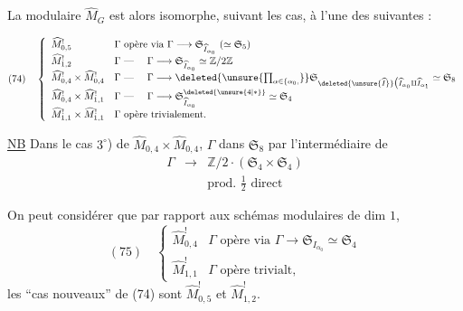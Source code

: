La   modulaire $\widehat M_G$ est alors isomorphe, suivant les cas, à l'une des suivantes :

\[
(74)\quad\left\{\begin{array}{ll}
\widehat M^!_{0,5}&\Gamma\text{ opère via }\Gamma\longrightarrow\mathfrak S_{\widehat I_{\alpha_0}}\ (\simeq\mathfrak S_5)\\
\widehat M^!_{1,2}&\Gamma\text{ --- }\quad\Gamma\longrightarrow\mathfrak S_{\widehat I_{\alpha_0}}\simeq\mathbb Z/2\mathbb Z\\
\widehat M^!_{0,4}\times\widehat M^!_{0,4}&\Gamma\text{ --- }\quad\Gamma\longrightarrow\deleted{\unsure{\prod_{\alpha\in\{\alpha_0,}}}\mathfrak S_{\deleted{\unsure{\widehat I}}\bigl(\widehat I_{\alpha_0}\amalg\widehat I_{\alpha_1}}\simeq\mathfrak S_8\\
\widehat M^!_{0,4}\times\widehat M^!_{1,1}&\Gamma\text{ --- }\quad\Gamma\longrightarrow\mathfrak S^{\deleted{\unsure{4|*}}}_{\widehat I_{\alpha_0}}\simeq\mathfrak S_4\\
\widehat M^!_{1,1}\times\widehat M^!_{1,1}&\Gamma\text{ opère trivialement.}
\end{array}\right.
\]

\uline{NB}  Dans le cas $3^\circ$) de $\widehat M_{0,4}\times\widehat M_{0,4}$, $\Gamma$  dans $\mathfrak S_8$ par l'intermédiaire de
\[
\begin{array}{rcl}
\Gamma&\longrightarrow&\mathbb Z/2\mathbin{\cdot}(\mathfrak S_4\times\mathfrak S_4)\\
&&\text{prod. }\frac12\text{ direct}
\end{array}
\]

On peut considérer que par rapport aux schémas modulaires  de dim $1$, 
\[
(75)\quad\left\{\begin{array}{ll}
\widehat M^!_{0,4}&\Gamma\text{ opère via }\Gamma\longrightarrow\mathfrak S_{I_{\alpha_0}}\simeq\mathfrak S_4\\
\widehat M^!_{1,1}&\Gamma\text{ opère trivialt},
\end{array}\right.
\]
les ``cas nouveaux'' de (74) sont $\widehat M^!_{0,5}$ et $\widehat M^!_{1,2}$.

